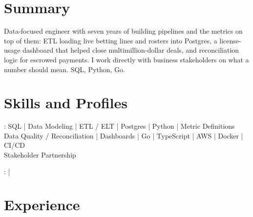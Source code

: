 \documentclass[print]{jack-resume}
\begin{document}
\pagecolor{darkmodeBackground}


\begin{minipage}[t][1cm][t]{.03\textwidth}
    \hfill
\end{minipage}

\section{Summary}
Data-focused engineer with seven years of building pipelines and the metrics on top of them: ETL loading live betting lines and rosters into Postgres, a license-usage dashboard that helped close multimillion-dollar deals, and reconciliation logic for escrowed payments. I work directly with business stakeholders on what a number should mean. SQL, Python, Go.
\sectionsep

\section{Skills and Profiles}
:
SQL \hfill | \hfill
Data Modeling \hfill | \hfill
ETL / ELT \hfill | \hfill
Postgres \hfill | \hfill
Python \hfill | \hfill
Metric Definitions \\
\hspace{1.0cm} Data Quality / Reconciliation \hfill | \hfill
Dashboards \hfill | \hfill
Go \hfill | \hfill
TypeScript \hfill | \hfill
AWS \hfill | \hfill
Docker \hfill | \hfill
CI/CD \\
\hspace{1.0cm} Stakeholder Partnership \\

\raggedright{
    :
      \href{https://www.linkedin.com/in/jack-sturtevant/}{ \ExternalLink} |
     \href{https://github.com/jacksturt}{ \ExternalLink}}

\section{Experience}
\end{document}
